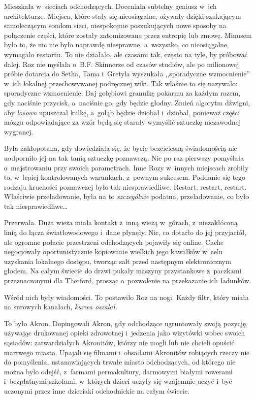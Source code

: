 \documentclass[oneside,polish,11pt,sfheadings]{mwbk}
\begin{document}
Mieszkała w~sieciach odchodzących. Doceniała subtelny geniusz w~ich
architekturze. Miejsca, które stały się nieosiągalne, ożywały dzięki
szukającym samoleczącym sondom sieci, niespokojnie poszukujących nowe
sposoby na połączenie części, które zostały zatomizowane przez entropię
lub zmowę. Minusem było to, że nic nie było naprawdę niesprawne, a~wszystko, co nieosiągalne, wymagało restartu. To nie działało, ale
czasami tak, często na tyle, by próbować dalej. Roz nie myślała o~B.F.
Skinnerze od czasów studiów, ale po milionowej próbie dotarcia do Setha,
Tama i~Gretyla wyszukała ,,sporadyczne wzmocnienie'' w~ich lokalnej
przechowywanej podręcznej wiki. Tak właśnie to się nazywało: sporadyczne
wzmocnienie. Daj gołębiowi granulkę pokarmu za każdym razem, gdy
naciśnie przycisk, a~naciśnie go, gdy będzie głodny. Zmień algorytm
dźwigni, aby \textit{losowo }upuszczał kulkę, a~gołąb będzie dziobał i~dziobał, ponieważ części mózgu odpowiadające za wzór będą się starały
wymyślić sztuczkę niezawodnej wygranej.

Była zakłopotana, gdy dowiedziała się, że bycie bezcielesną świadomością
nie uodporniło jej na tak tanią sztuczkę poznawczą. Nie po raz pierwszy
pomyślała o~majstrowaniu przy swoich parametrach. Inne Rozy w~innych
miejscach zrobiły to, w~lepiej kontrolowanych warunkach, z~pewnym
sukcesem. Poddanie się tego rodzaju kruchości poznawczej było tak
niesprawiedliwe. Restart, restart, restart. Właściwie przeładowanie,
była na to \textit{szczególnie} podatna, przeładowanie, co było tak
niesprawiedliwe\ldots 

Przerwała. Duża wieża miała kontakt z~inną wieżą w~górach, z~niezakłóconą linią do łącza światłowodowego i~dane płynęły. Nic, co
dotarło do jej przyjaciół, ale ogromne połacie przestrzeni odchodzących
pojawiły się online. Cache negocjowały oportunistycznie kopiowanie
wielkich jego kawałków w~celu uzyskania lokalnego dostępu, tworząc salt
przed następnym elektronicznym głodem. Na całym świecie do drzwi pukały
maszyny przystankowe z~paczkami przeznaczonymi dla Thetford, prosząc o~pozwolenie na przekazanie ich ładunków.

Wśród nich były wiadomości. To postawiło Roz na nogi. Każdy filtr, który
miała na surowych kanałach, \textit{kurwa oszalał}.

To było Akron. Dopingowali Akron, gdy odchodzące ugruntowały swoją
pozycję, używając drukowanej opieki zdrowotnej i~jedzenia jako wizytówki
wobec swoich sąsiadów: zatwardziałych Akronitów, którzy nie mogli lub
nie chcieli opuścić martwego miasta. Upajali się filmami i~obsadami
Akronitów robiących rzeczy nie do pomyślenia, ustanawiających trwałe
miasto odchodzących, od którego nie można było odejść, z~farmami
permakultury, darmowymi białymi rowerami i~bezpłatnymi szkołami, w~których dzieci uczyły się wzajemnie uczyć i~być uczonymi przez inne
dzieciaki odchodnickie na całym świecie.
\end{document}

